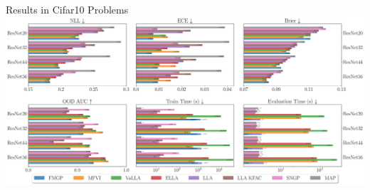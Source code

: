 \documentclass[aspectratio=149]{beamer}
\begin{document}
    
    {
    \begin{frame}{Results in Cifar10 Problems}
        \centering
        \includegraphics[width=1\linewidth]{slides_imgs/cifar10.pdf}
    \end{frame}}
\end{document}

